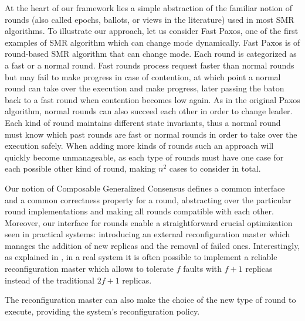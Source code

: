 At the heart of our framework lies a simple abstraction of the familiar notion of rounds (also called epochs, ballots, or views in the literature) used in most SMR algorithms. To illustrate our approach, let us consider Fast Paxos, one of the first examples of SMR algorithm which can change mode dynamically.
Fast Paxos is of round-based SMR algorithm that can change mode. Each round is categorized as a fast or a normal round. Fast rounds process request faster than normal rounds but may fail to make progress in case of contention, at which point a normal round can take over the execution and make progress, later passing the baton back to a fast round when contention becomes low again. As in the original Paxos algorithm, normal rounds can also succeed each other in order to change
leader. Each kind of round maintains different state invariants, thus a normal round must know which past rounds are fast or normal rounds in order to take over the execution safely. When adding more kinds of rounds such an approach will quickly become unmanageable, as each type of rounds must have one case for each possible other kind of round, making $n^2$ cases to consider in total.

Our notion of Composable Generalized Consensus defines a common interface and a common correctness property for a round, abstracting over the particular round implementations and making all rounds compatible with each other. 
Moreover, our interface for rounds enable a straightforward crucial optimization seen in practical systems: introducing an external reconfiguration master which manages the addition of new replicas and the removal of failed ones. Interestingly, as explained in \cite{LamportMalkhiZhou09VerticalPaxosPrimarybackupReplication}, in a real system it is often possible to implement a reliable reconfiguration master which allows to tolerate $f$ faults with $f+1$ replicas instead of the traditional $2f+1$ replicas.

The reconfiguration master can also make the choice of the new type of round to execute, providing the system's reconfiguration policy. 


